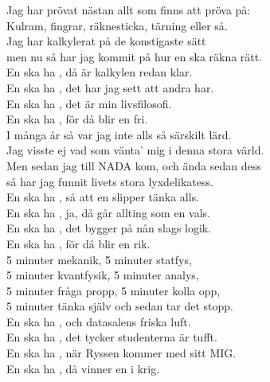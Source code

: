 \documentclass[a6paper, 10pt, twoside]{article}
\begin{document}
\noindent
\begin{center}
\end{center}
\begin{lyrics}
Jag har prövat nästan allt som finns att pröva på:\\
Kulram, fingrar, räknesticka, tärning eller så.\\
Jag har kalkylerat på de konstigaste sätt\\
men nu så har jag kommit på hur en ska räkna rätt.
\vspace{5pt} \\
En ska ha , då är kalkylen redan klar.\\
En ska ha , det har jag sett att andra har.\\
En ska ha , det är min livsfilosofi.\\
En ska ha , för då blir en fri.
\vspace{5pt} \\
I många år så var jag inte alls så särskilt lärd.\\
Jag visste ej vad som vänta’ mig i denna stora värld.\\
Men sedan jag till NADA kom, och ända sedan dess\\
så har jag funnit livets stora lyxdelikatess.
\vspace{5pt} \\
En ska ha , så att en slipper tänka alls.\\
En ska ha , ja, då går allting som en vals.\\
En ska ha , det bygger på nån slags logik.\\
En ska ha , för då blir en rik.
\vspace{5pt} \\
5 minuter mekanik, 5 minuter statfys,\\
5 minuter kvantfysik, 5 minuter analys,\\
5 minuter fråga propp, 5 minuter kolla opp,\\
5 minuter tänka själv och sedan tar det stopp.
\vspace{5pt} \\
En ska ha , och datasalens friska luft.\\
En ska ha , det tycker studenterna är tufft.\\
En ska ha , när Ryssen kommer med sitt MIG.\\
En ska ha , då vinner en i krig.
\end{lyrics}
\end{document}
